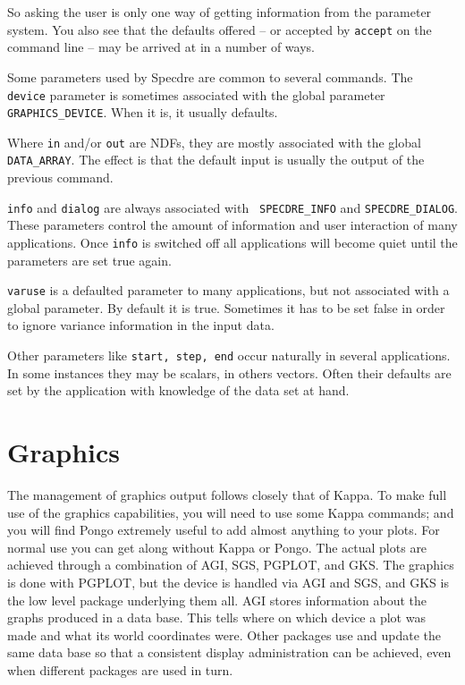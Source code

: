 So asking the user is only one way of getting information from the parameter
system. You also see that the defaults offered -- or accepted by {\tt accept}
on the command line -- may be arrived at in a number of ways.

Some parameters used by Specdre are common to several commands. The {\tt
device} parameter is sometimes associated with the global parameter {\tt
GRAPHICS\_DEVICE}. When it is, it usually defaults.

Where {\tt in} and/or {\tt out} are NDFs, they are mostly associated with the
global {\tt DATA\_ARRAY}. The effect is that the default input is usually the
output of the previous command.

{\tt info} and {\tt dialog} are always associated with {\tt
SPECDRE\_INFO} and {\tt SPECDRE\_DIALOG}. These parameters control the
amount of information and user interaction of many applications. Once
{\tt info} is switched off all applications will become quiet until the
parameters are set true again.

{\tt varuse} is a defaulted parameter to many applications, but not associated
with a global parameter. By default it is true. Sometimes it has to be set
false in order to ignore variance information in the input data.

Other parameters like {\tt start, step, end} occur naturally in several
applications. In some instances they may be scalars, in others vectors.
Often their defaults are set by the application with knowledge of the data set
at hand.


\goodbreak
\section{Graphics}
\label{graphic}

The management of graphics output follows closely that of Kappa. To make
full use of the graphics capabilities, you will need to use some Kappa
commands; and you will find Pongo extremely useful to add almost
anything to your plots.  For normal use you can get along without
Kappa or Pongo.
The actual plots are achieved through a combination of AGI, SGS,
PGPLOT, and GKS. The graphics is done with PGPLOT, but the device is
handled via AGI and SGS, and GKS is the low level package underlying
them all.  AGI stores information about the graphs produced in a data
base. This tells where on which device a plot was made and what its
world coordinates were.  Other packages use and update the same data
base so that a consistent display administration can be achieved, even
when different packages are used in turn.

